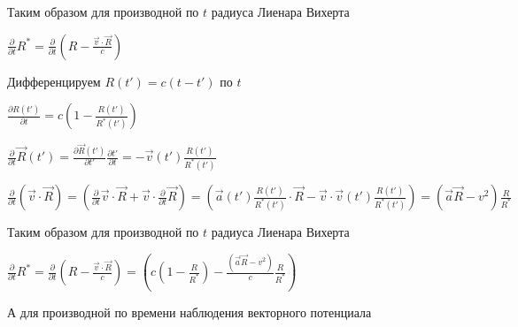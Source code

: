 \documentclass[11pt]{article}
\begin{document}
    Таким образом для производной по \(t\) радиуса Лиенара Вихерта

\(\frac{\partial }{\partial t} {{R}^{*}}  = \frac{\partial }{\partial t} {\left( R-\frac{\overrightarrow{v}\cdot \overrightarrow{R}}{c} \right)}\)

    Дифференцируем \(R\left(t'\right) = c \left(t-t'\right)\) по \(t\)

\(\frac{\partial R\left(t'\right)}{\partial t} = c \left(1 - \frac{R\left(t'\right)}{{{R}^{*}}\left(t'\right)}\right)\)

    \(\frac{\partial }{\partial t} \vec R\left(t'\right)  = \frac{\partial \vec R\left(t'\right)}{\partial t'}\frac{\partial t'}{\partial t}  = -\vec v\left(t'\right)\frac{R\left(t'\right)}{{{R}^{*}}\left(t'\right)}\)

    \(\frac{\partial }{\partial t}{\left(\overrightarrow{v}\cdot \overrightarrow{R} \right)}  = {\left(\frac{\partial }{\partial t}\overrightarrow{v}\cdot \overrightarrow{R} + \overrightarrow{v}\cdot \frac{\partial }{\partial t}\overrightarrow{R} \right)}  = {\left(\vec a\left(t'\right) \frac{R\left(t'\right)}{{{R}^{*}}\left(t'\right)}\cdot \overrightarrow{R} - \overrightarrow{v}\cdot \vec v\left(t'\right)\frac{R\left(t'\right)}{{{R}^{*}}\left(t'\right)} \right)}  = {\left(\vec a \vec R - v^2 \right)\frac{R}{{{R}^{*}}}}\)

    Таким образом для производной по \(t\) радиуса Лиенара Вихерта

\(\frac{\partial }{\partial t} {{R}^{*}}  = \frac{\partial }{\partial t} {\left( R-\frac{\overrightarrow{v}\cdot \overrightarrow{R}}{c} \right)}  = \left( c \left(1 - \frac{R}{{{R}^{*}}}\right)-\frac{\left(\vec a \vec R - v^2 \right)}{c}\frac{R}{{{R}^{*}}} \right)\)

    А для производной по времени наблюдения векторного потенциала
\end{document}
